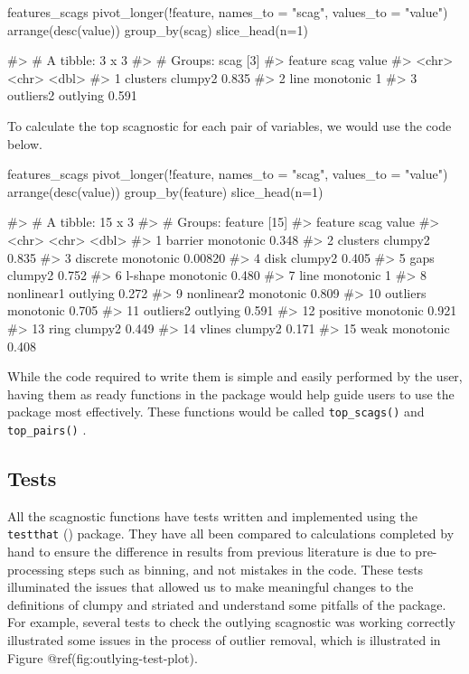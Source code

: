 \begin{Schunk}
\begin{Sinput}
features_scags %
  pivot_longer(!feature, names_to = "scag", values_to = "value") %
  arrange(desc(value)) %
  group_by(scag) %
  slice_head(n=1)
\end{Sinput}
\begin{Soutput}
#> # A tibble: 3 x 3
#> # Groups:   scag [3]
#>   feature   scag      value
#>   <chr>     <chr>     <dbl>
#> 1 clusters  clumpy2   0.835
#> 2 line      monotonic 1    
#> 3 outliers2 outlying  0.591
\end{Soutput}
\end{Schunk}

To calculate the top scagnostic for each pair of variables, we would use
the code below.

\begin{Schunk}
\begin{Sinput}
features_scags %
  pivot_longer(!feature, names_to = "scag", values_to = "value") %
  arrange(desc(value)) %
  group_by(feature) %
  slice_head(n=1)
\end{Sinput}
\begin{Soutput}
#> # A tibble: 15 x 3
#> # Groups:   feature [15]
#>    feature    scag        value
#>    <chr>      <chr>       <dbl>
#>  1 barrier    monotonic 0.348  
#>  2 clusters   clumpy2   0.835  
#>  3 discrete   monotonic 0.00820
#>  4 disk       clumpy2   0.405  
#>  5 gaps       clumpy2   0.752  
#>  6 l-shape    monotonic 0.480  
#>  7 line       monotonic 1      
#>  8 nonlinear1 outlying  0.272  
#>  9 nonlinear2 monotonic 0.809  
#> 10 outliers   monotonic 0.705  
#> 11 outliers2  outlying  0.591  
#> 12 positive   monotonic 0.921  
#> 13 ring       clumpy2   0.449  
#> 14 vlines     clumpy2   0.171  
#> 15 weak       monotonic 0.408
\end{Soutput}
\end{Schunk}

While the code required to write them is simple and easily performed by
the user, having them as ready functions in the package would help guide
users to use the package most effectively. These functions would be
called \texttt{top\_scags()} and \texttt{top\_pairs()} .

\hypertarget{tests}{%
\subsection{Tests}\label{tests}}

All the scagnostic functions have tests written and implemented using
the \texttt{testthat} (\citet{testthat}) package. They have all been
compared to calculations completed by hand to ensure the difference in
results from previous literature is due to pre-processing steps such as
binning, and not mistakes in the code. These tests illuminated the
issues that allowed us to make meaningful changes to the definitions of
clumpy and striated and understand some pitfalls of the package. For
example, several tests to check the outlying scagnostic was working
correctly illustrated some issues in the process of outlier removal,
which is illustrated in Figure @ref(fig:outlying-test-plot).

